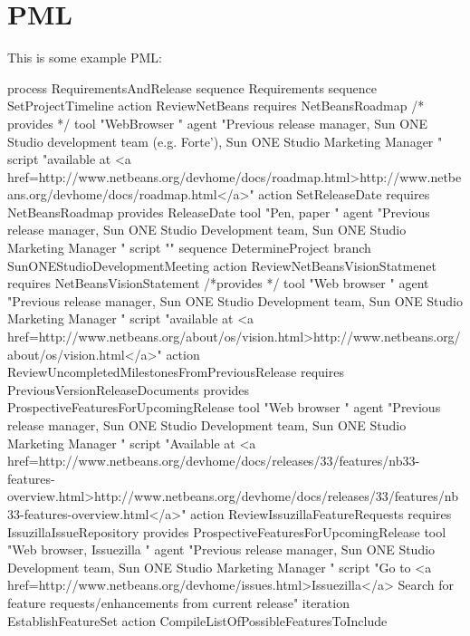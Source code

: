 \section{PML}\label{sec:PML}

This is some example PML:

\newpage
\begin{pml}
process RequirementsAndRelease {
  sequence Requirements {
    sequence SetProjectTimeline {
      action ReviewNetBeans {
	requires { NetBeansRoadmap }
/*	provides { }*/
	tool { "WebBrowser " }
	agent { "Previous release manager, Sun ONE Studio development team (e.g. Forte'), Sun ONE Studio Marketing Manager " }
	script {
	  "available at <a href=http://www.netbeans.org/devhome/docs/roadmap.html>http://www.netbeans.org/devhome/docs/roadmap.html</a>"
	}
      }
      action SetReleaseDate {
	requires { NetBeansRoadmap }
	provides { ReleaseDate }
	tool { "Pen, paper " }
	agent { "Previous release manager, Sun ONE Studio Development team, Sun ONE Studio Marketing Manager " }
	script { "" }
      }
      sequence DetermineProject {
	branch SunONEStudioDevelopmentMeeting {
	  action ReviewNetBeansVisionStatmenet {
	    requires { NetBeansVisionStatement }
	    /*provides { }*/
	    tool { "Web browser " }
	    agent { "Previous release manager, Sun ONE Studio Development team, Sun ONE Studio Marketing Manager " }
	    script {
	      "available at <a href=http://www.netbeans.org/about/os/vision.html>http://www.netbeans.org/about/os/vision.html</a>"
	    }
	  }
	  action ReviewUncompletedMilestonesFromPreviousRelease {
	    requires { PreviousVersionReleaseDocuments }
	    provides { ProspectiveFeaturesForUpcomingRelease }
	    tool { "Web browser " }
	    agent { "Previous release manager, Sun ONE Studio Development team, Sun ONE Studio Marketing Manager " }
	    script {
	      "Available at <a href=http://www.netbeans.org/devhome/docs/releases/33/features/nb33-features-overview.html>http://www.netbeans.org/devhome/docs/releases/33/features/nb33-features-overview.html</a>"
	    }
	  }
	  action ReviewIssuzillaFeatureRequests {
	    requires { IssuzillaIssueRepository }
	    provides { ProspectiveFeaturesForUpcomingRelease }
	    tool { "Web browser, Issuezilla " }
	    agent { "Previous release manager, Sun ONE Studio Development team, Sun ONE Studio Marketing Manager " }
	    script {
	      "Go to <a href=http://www.netbeans.org/devhome/issues.html>Issuezilla</a>
	      Search for feature requests/enhancements from current release"
	    }
	  }
	}
	iteration EstablishFeatureSet {
	  action CompileListOfPossibleFeaturesToInclude {
}}}}}}
\end{pml}
